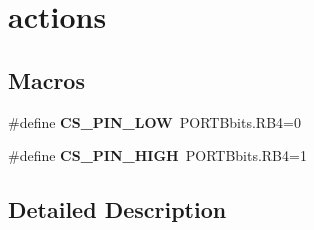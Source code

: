 \hypertarget{group___hardware}{}\section{actions}
\label{group___hardware}
\subsection*{Macros}
\begin{DoxyCompactItemize}
\item 
\mbox{\label{group___hardware_ga86b6db148222b2e6c27f50ade652aed0}} 
\#define {\bfseries C\+S\+\_\+\+P\+I\+N\+\_\+\+L\+OW}~P\+O\+R\+T\+Bbits.\+R\+B4=0
\item 
\mbox{\label{group___hardware_ga0113abc1907a59045f1cb1c5541f3aac}} 
\#define {\bfseries C\+S\+\_\+\+P\+I\+N\+\_\+\+H\+I\+GH}~P\+O\+R\+T\+Bbits.\+R\+B4=1
\end{DoxyCompactItemize}


\subsection{Detailed Description}
